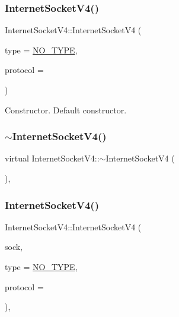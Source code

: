 \subsubsection{\texorpdfstring{Internet\+Socket\+V4()}{InternetSocketV4()}\hspace{0.1cm}{\footnotesize\ttfamily [1/2]}}
{\footnotesize\ttfamily Internet\+Socket\+V4\+::\+Internet\+Socket\+V4 (\begin{DoxyParamCaption}\item[{\hyperlink{classSocketClass_a2182dd9fee09459fabb99e6ae717f595}{Sock\+Type}}]{type = {\ttfamily \hyperlink{classSocketClass_a2182dd9fee09459fabb99e6ae717f595a8c7f955ea5b71498ff1d469345d813ad}{N\+O\+\_\+\+T\+Y\+PE}},  }\item[{int}]{protocol = {} }\end{DoxyParamCaption})\hspace{0.3cm}{\ttfamily [inline]}}

Constructor. Default constructor. \mbox{\label{classInternetSocketV4_af7edfb3b33ba40c6c93bfb9ffe0ce318}} 
\subsubsection{\texorpdfstring{$\sim$\+Internet\+Socket\+V4()}{~InternetSocketV4()}}
{\footnotesize\ttfamily virtual Internet\+Socket\+V4\+::$\sim$\+Internet\+Socket\+V4 (\begin{DoxyParamCaption}{ }\end{DoxyParamCaption})\hspace{0.3cm}{\ttfamily [inline]}, {\ttfamily [virtual]}}

\mbox{\label{classInternetSocketV4_ad2e60863f606afa5d1a45b413538baff}} 
\subsubsection{\texorpdfstring{Internet\+Socket\+V4()}{InternetSocketV4()}\hspace{0.1cm}{\footnotesize\ttfamily [2/2]}}
{\footnotesize\ttfamily Internet\+Socket\+V4\+::\+Internet\+Socket\+V4 (\begin{DoxyParamCaption}\item[{int}]{sock,  }\item[{\hyperlink{classSocketClass_a2182dd9fee09459fabb99e6ae717f595}{Sock\+Type}}]{type = {\ttfamily \hyperlink{classSocketClass_a2182dd9fee09459fabb99e6ae717f595a8c7f955ea5b71498ff1d469345d813ad}{N\+O\+\_\+\+T\+Y\+PE}},  }\item[{int}]{protocol = {} }\end{DoxyParamCaption})\hspace{0.3cm}{\ttfamily [inline]}, {\ttfamily [protected]}}

